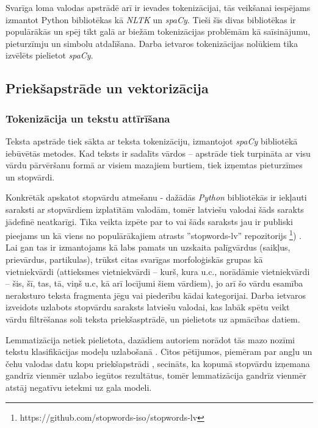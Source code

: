 Svarīga loma valodas apstrādē arī ir ievades tokenizācijai, tās veikšanai iespējams izmantot Python bibliotēkas kā \textit{NLTK} un \textit{spaCy}. Tieši šīs divas bibliotēkas ir populārākās un spēj tikt galā ar biežām tokenizācijas problēmām kā saīsinājumu, pieturzīmju un simbolu atdalīšana. Darba ietvaros tokenizācijas nolūkiem tika izvēlēts pielietot \textit{spaCy}.

\subsection{Priekšapstrāde un vektorizācija}
\subsubsection{Tokenizācija un tekstu attīrīšana}
Teksta apstrāde tiek sākta ar teksta tokenizāciju, izmantojot \textit{spaCy} bibliotēkā iebūvētās metodes. Kad teksts ir sadalīts vārdos – apstrāde tiek turpināta ar visu vārdu pārvēršanu formā ar visiem mazajiem burtiem, tiek izņemtas pieturzīmes un stopvārdi.

Konkrētāk apskatot stopvārdu atmešanu - dažādās \textit{Python} bibliotēkās ir iekļauti saraksti ar stopvārdiem izplatītām valodām, tomēr latviešu valodai šāds sarakts jādefinē neatkarīgi. Tika veikta izpēte par to vai šāds saraksts jau ir publiski pieejams un kā viens no populārākajiem atrasts ''stopwords-lv'' repozitorijs \footnote{https://github.com/stopwords-iso/stopwords-lv}) . Lai gan tas ir izmantojams kā labs pamats un uzskaita palīgvārdus (saikļus, prievārdus, partikulas), trūkst citas svarīgas morfoloģiskās grupas kā vietniekvārdi (attieksmes vietniekvārdi – kurš, kura u.c., norādāmie vietniekvārdi – šis, šī, tas, tā, viņš u.c, kā arī locījumi šiem vārdiem), jo arī šo vārdu esamība neraksturo teksta fragmenta jēgu vai piederību kādai kategorijai. Darba ietvaros izveidots uzlabots stopvārdu saraksts latviešu valodai, kas labāk spētu veikt vārdu filtrēšanas soli teksta priekšasptrādē, un pielietots uz apmācības datiem. 

Lemmatizācija netiek pielietota, dazādiem autoriem norādot tās mazo nozīmi tekstu klasifikācijas modeļu uzlabošanā \cite{santos2023effect}. Citos pētījumos, piemēram par angļu un čehu valodas datu kopu priekšapstrādi \cite{normalizationTextClassification}, secināts, ka kopumā stopvārdu izņemana gandrīz vienmēr uzlabo iegūtos rezultātus, tomēr lemmatizācija gandrīz vienmēr atstāj negatīvu ietekmi uz gala modeli.


